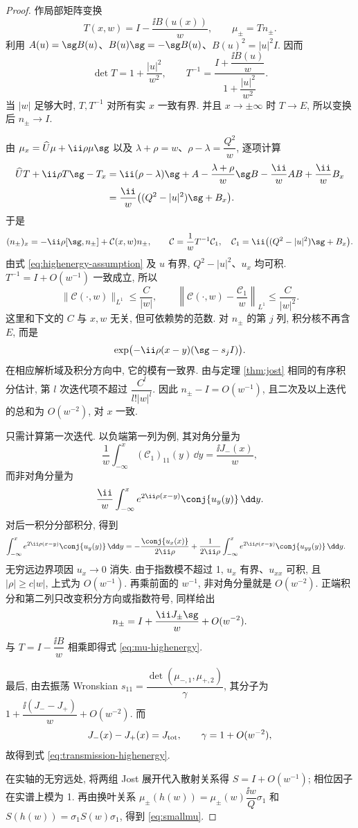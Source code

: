 \begin{proof}
作局部矩阵变换
\[
T(x,w)=I-\dfrac{\ii B(u(x))}{w},\qquad
\mu_\pm=Tn_\pm.
\]
利用 $A(u)=\sg B(u)$、$B(u)\sg=-\sg B(u)$、$B(u)^2=|u|^2I$. 因而
\[
\det T=1+\dfrac{|u|^2}{w^2},\qquad
T^{-1}=\dfrac{I+\dfrac{\ii B(u)}{w}}{1+\dfrac{|u|^2}{w^2}}.
\]
当 $|w|$ 足够大时, $T,T^{-1}$ 对所有实 $x$ 一致有界. 并且 $x\to\pm\infty$ 时 $T\to E$, 所以变换后 $n_\pm\to I$.

由 $\mu_x=\widehat U\mu+\ii\rho\mu\sg$ 以及 $\lambda+\rho=w$、$\rho-\lambda=\dfrac{Q^2}{w}$, 逐项计算
\begin{align*}
\widehat UT+\ii\rho T\sg-T_x
&=\ii(\rho-\lambda)\sg+A
-\dfrac{\lambda+\rho}{w}\sg B
-\dfrac{\ii}{w}AB+\dfrac{\ii}{w}B_x\\
&=\dfrac{\ii}{w}\bigl((Q^2-|u|^2)\sg+B_x\bigr).
\end{align*}
于是
\begin{equation}\label{eq:n-volterra-system}
(n_\pm)_x=-\ii\rho[\sg,n_\pm]+\mathcal C(x,w)n_\pm,
\qquad
\mathcal C=\dfrac{1}{w}T^{-1}\mathcal C_1,
\quad
\mathcal C_1=\ii\bigl((Q^2-|u|^2)\sg+B_x\bigr).
\end{equation}
由式 \eqref{eq:highenergy-assumption} 及 $u$ 有界, $Q^2-|u|^2$、$u_x$ 均可积. $T^{-1}=I+O(w^{-1})$ 一致成立, 所以
\[
\|\mathcal C(\cdot,w)\|_{L^1}\le\dfrac{C}{|w|},\qquad
\left\|\mathcal C(\cdot,w)-\dfrac{\mathcal C_1}{w}\right\|_{L^1}
\le\dfrac{C}{|w|^2}.
\]
这里和下文的 $C$ 与 $x,w$ 无关, 但可依赖势的范数. 对 $n_\pm$ 的第 $j$ 列, 积分核不再含 $E$, 而是
\[
\exp\bigl(-\ii\rho(x-y)(\sg-s_jI)\bigr).
\]
在相应解析域及积分方向中, 它的模有一致界. 由与定理 \ref{thm:jost} 相同的有序积分估计, 第 $l$ 次迭代项不超过
$\dfrac{C^l}{l!|w|^l}$. 因此 $n_\pm-I=O(w^{-1})$, 且二次及以上迭代的总和为 $O(w^{-2})$, 对 $x$ 一致.

只需计算第一次迭代. 以负端第一列为例, 其对角分量为
\[
\dfrac{1}{w}\int_{-\infty}^{x}(\mathcal C_1)_{11}(y)\,\dd y
=\dfrac{\ii J_-(x)}{w},
\]
而非对角分量为
\[
\dfrac{\ii}{w}\int_{-\infty}^{x}
e^{2\ii\rho(x-y)}\conj{u_y(y)}\,\dd y.
\]
对后一积分分部积分, 得到
\begin{align*}
\int_{-\infty}^{x}e^{2\ii\rho(x-y)}\conj{u_y(y)}\,\dd y
&=-\dfrac{\conj{u_x(x)}}{2\ii\rho}
+\dfrac{1}{2\ii\rho}\int_{-\infty}^{x}
e^{2\ii\rho(x-y)}\conj{u_{yy}(y)}\,\dd y.
\end{align*}
无穷远边界项因 $u_x\to0$ 消失. 由于指数模不超过 1, $u_x$ 有界、$u_{xx}$ 可积, 且 $|\rho|\ge c|w|$, 上式为 $O(w^{-1})$. 再乘前面的 $w^{-1}$, 非对角分量就是 $O(w^{-2})$. 正端积分和第二列只改变积分方向或指数符号, 同样给出
\[
n_\pm=I+\dfrac{\ii J_\pm\sg}{w}+O(w^{-2}).
\]
与 $T=I-\dfrac{\ii B}{w}$ 相乘即得式 \eqref{eq:mu-highenergy}.

最后, 由去振荡 Wronskian
$s_{11}=\dfrac{\det(\mu_{-,1},\mu_{+,2})}{\gamma}$, 其分子为
$1+\dfrac{\ii(J_--J_+)}{w}+O(w^{-2})$. 而
\[
J_-(x)-J_+(x)=J_{\rm tot},\qquad
\gamma=1+O(w^{-2}),
\]
故得到式 \eqref{eq:transmission-highenergy}.

在实轴的无穷远处, 将两组 Jost 展开代入散射关系得 $S=I+O(w^{-1})$; 相位因子在实谱上模为 1. 再由换叶关系
$\mu_\pm(h(w))=\mu_\pm(w)\dfrac{\ii w}{Q}\sigma_1$ 和
$S(h(w))=\sigma_1S(w)\sigma_1$, 得到 \eqref{eq:smallmu}.
\end{proof}

